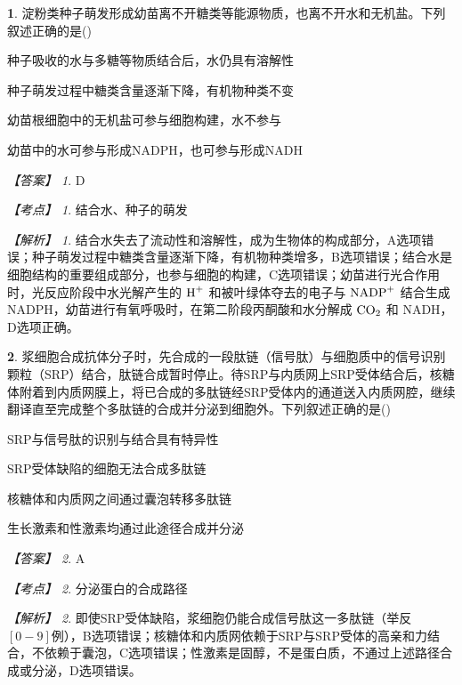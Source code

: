 \documentclass[UTF8, 10pt, a4paper, oneside]{ctexart}
\theoremstyle{definition}
\newtheorem{exercise}{}
\theoremstyle{remark}
\newtheorem*{answer}{【答案】}
\newtheorem*{point}{【考点】}      %
\newtheorem*{explanation}{【解析】}     %
\theoremstyle{plain}
\begin{document}
\begin{exercise}
    淀粉类种子萌发形成幼苗离不开糖类等能源物质，也离不开水和无机盐。下列叙述正确的是\quad(\quad)
    \begin{adjustwidth}{2em}{}
        \begin{asparaenum}[A. ]
            \item 种子吸收的水与多糖等物质结合后，水仍具有溶解性
            \item 种子萌发过程中糖类含量逐渐下降，有机物种类不变
            \item 幼苗根细胞中的无机盐可参与细胞构建，水不参与
            \item 幼苗中的水可参与形成NADPH，也可参与形成NADH
        \end{asparaenum}
    \end{adjustwidth}
    \begin{answer}
        D
    \end{answer}
    \begin{point}
        结合水、种子的萌发
    \end{point}
    \begin{explanation}
        结合水失去了流动性和溶解性，成为生物体的构成部分，A选项错误；种子萌发过程中糖类含量逐渐下降，有机物种类增多，B选项错误；结合水是细胞结构的重要组成部分，也参与细胞的构建，C选项错误；幼苗进行光合作用时，光反应阶段中水光解产生的 $\ce{H^+}$ 和被叶绿体夺去的电子与 $\ce{NADP+}$ 结合生成 NADPH，幼苗进行有氧呼吸时，在第二阶段丙酮酸和水分解成 $\ce{CO2}$ 和 NADH，D选项正确。
    \end{explanation}
\end{exercise}
\begin{exercise}
    浆细胞合成抗体分子时，先合成的一段肽链（信号肽）与细胞质中的信号识别颗粒（SRP）结合，肽链合成暂时停止。待SRP与内质网上SRP受体结合后，核糖体附着到内质网膜上，将已合成的多肽链经SRP受体内的通道送入内质网腔，继续翻译直至完成整个多肽链的合成并分泌到细胞外。下列叙述正确的是\quad(\quad)
    \begin{adjustwidth}{2em}{}
        \begin{asparaenum}[A. ]
            \item SRP与信号肽的识别与结合具有特异性
            \item SRP受体缺陷的细胞无法合成多肽链
            \item 核糖体和内质网之间通过囊泡转移多肽链
            \item 生长激素和性激素均通过此途径合成并分泌
        \end{asparaenum}
    \end{adjustwidth}
    \begin{answer}
        A
    \end{answer}
    \begin{point}
        分泌蛋白的合成路径
    \end{point}
    \begin{explanation}
        即使SRP受体缺陷，浆细胞仍能合成信号肽这一多肽链（举反\([0-9]\)例），B选项错误；核糖体和内质网依赖于SRP与SRP受体的高亲和力结合，不依赖于囊泡，C选项错误；性激素是固醇，不是蛋白质，不通过上述路径合成或分泌，D选项错误。
    \end{explanation}
\end{exercise}
\end{document}
